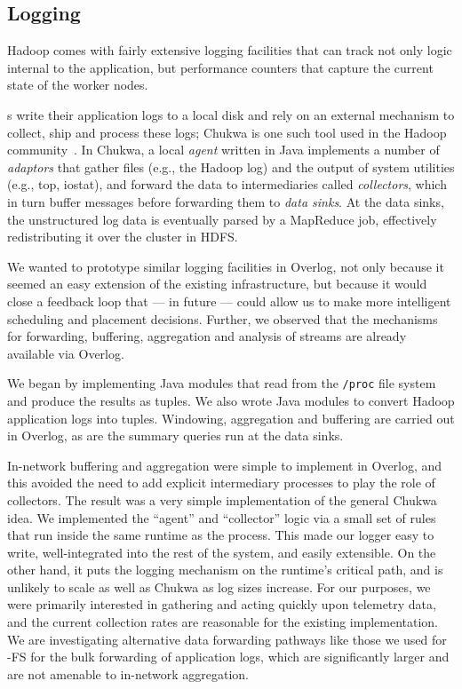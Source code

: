 \subsection{Logging}
Hadoop comes with fairly extensive logging facilities that can track
not only logic internal to the application, but performance counters
that capture the current state of the worker nodes.

{\TT}s write their application logs to a local disk and rely on an
external mechanism to collect, ship and process these logs; Chukwa is
one such tool used in the Hadoop community~\cite{chukwa}.  In Chukwa,
a local {\em agent} written in Java implements a number of {\em
  adaptors} that gather files (e.g., the Hadoop log) and the output of
system utilities (e.g., top, iostat), and forward the data to
intermediaries called {\em collectors}, which in turn buffer messages
before forwarding them to {\em data sinks}.  At the data sinks, the
unstructured log data is eventually parsed by a MapReduce job,
effectively redistributing it over the cluster in HDFS.
 
We wanted to prototype similar logging facilities in Overlog, not only
because it seemed an easy extension of the existing infrastructure,
but because it would close a feedback loop that --- in future ---
could allow us to make more intelligent scheduling and placement
decisions.  Further, we observed that the mechanisms for forwarding,
buffering, aggregation and analysis of streams are already available
via Overlog.

We began by implementing Java modules that read from the
\texttt{/proc} file system and produce the results as \JOL tuples. We
also wrote Java modules to convert Hadoop application logs into
tuples. Windowing, aggregation and buffering are carried out in
Overlog, as are the summary queries run at the data sinks.

In-network buffering and aggregation were simple to implement in
Overlog, and this avoided the need to add explicit intermediary
processes to play the role of collectors.  The result was a very
simple implementation of the general Chukwa idea.  We implemented the
``agent'' and ``collector'' logic via a small set of rules that run
inside the same \JOL runtime as the \NN process.  This made our logger
easy to write, well-integrated into the rest of the system, and easily
extensible.  On the other hand, it puts the logging mechanism on the
runtime's critical path, and is unlikely to scale as well as Chukwa as
log sizes increase.  For our purposes, we were primarily interested in
gathering and acting quickly upon telemetry data, and the current
collection rates are reasonable for the existing \JOL implementation.
We are investigating alternative data forwarding pathways like those
we used for \BOOM-FS for the bulk forwarding of application logs,
which are significantly larger and are not amenable to in-network
aggregation.
